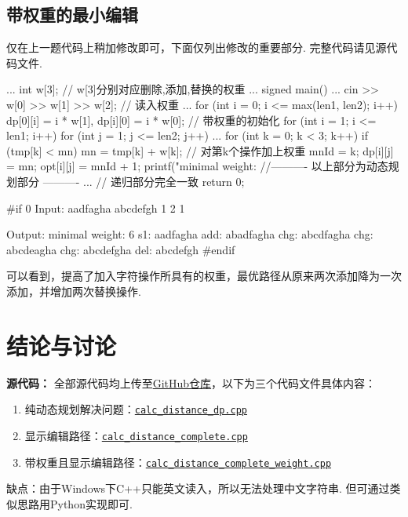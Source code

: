 \documentclass[12pt, a4paper, oneside]{ctexart}
\numberwithin{equation}{section}  %
\begin{document}
\subsection{带权重的最小编辑}
    仅在上一题代码上稍加修改即可，下面仅列出修改的重要部分. 完整代码请见源代码文件.
    \begin{cppcode}
...
int w[3];  // w[3]分别对应删除,添加,替换的权重
...
signed main() {
...
    cin >> w[0] >> w[1] >> w[2];  // 读入权重
...
    for (int i = 0; i <= max(len1, len2); i++) dp[0][i] = i * w[1], dp[i][0] = i * w[0];  // 带权重的初始化
    for (int i = 1; i <= len1; i++) {
        for (int j = 1; j <= len2; j++) {
            ...
            for (int k = 0; k < 3; k++) {
                if (tmp[k] < mn) {
                    mn = tmp[k] + w[k];  // 对第k个操作加上权重
                    mnId = k;
                }
            }
            dp[i][j] = mn;
            opt[i][j] = mnId + 1;
        }
    }
    printf("minimal weight: %
    //---------- 以上部分为动态规划部分 ----------
    ...  //  递归部分完全一致
    return 0;
}

#if 0
Input:
aadfagha
abcdefgh
1 2 1

Output:
minimal weight: 6
s1:  aadfagha
add: abadfagha
chg: abcdfagha
chg: abcdeagha
chg: abcdefgha
del: abcdefgh
#endif
    \end{cppcode}
    可以看到，提高了加入字符操作所具有的权重，最优路径从原来两次添加降为一次添加，并增加两次替换操作.

\section{结论与讨论}
\textbf{源代码：}
全部源代码均上传至\href{https://github.com/wty-yy/LaTex-Projects/tree/main/NLP/hw1}{GitHub仓库}，以下为三个代码文件具体内容：
\begin{enumerate}
    \item 纯动态规划解决问题：\href{https://github.com/wty-yy/LaTex-Projects/blob/main/NLP/hw1/calc_distance_dp.cpp}{\texttt{calc\_distance\_dp.cpp}}
    \item 显示编辑路径：\href{https://github.com/wty-yy/LaTex-Projects/blob/main/NLP/hw1/calc_distance_complete.cpp}{\texttt{calc\_distance\_complete.cpp}}
    \item 带权重且显示编辑路径：\href{https://github.com/wty-yy/LaTex-Projects/blob/main/NLP/hw1/calc_distance_complete_weight.cpp}{\texttt{calc\_distance\_complete\_weight.cpp}}
\end{enumerate}

缺点：由于Windows下C++只能英文读入，所以无法处理中文字符串. 但可通过类似思路用Python实现即可.
\end{document}
